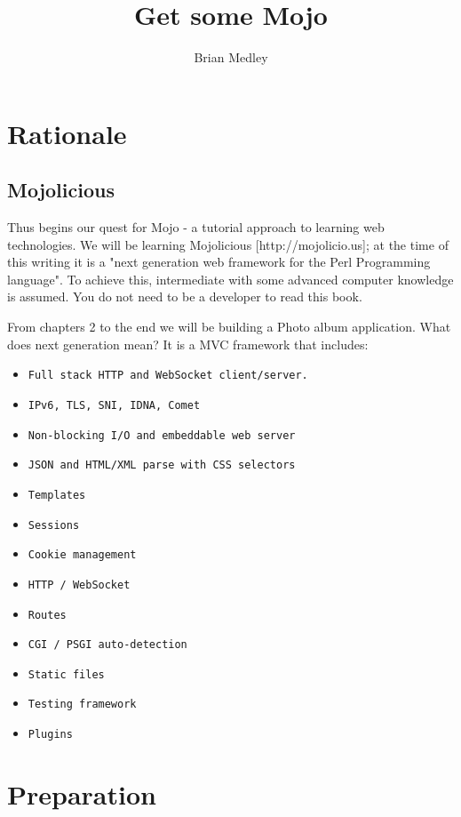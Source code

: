 \documentclass[14pt]{extreport}
\begin{document}
\title{Get some Mojo}
\author{Brian Medley}

\maketitle
\tableofcontents

\chapter*{Rationale}

\section{Mojolicious}

Thus begins our quest for Mojo - a tutorial approach to learning web
technologies. We will be learning Mojolicious [http://mojolicio.us]; at the
time of this writing it is a "next generation web framework for the Perl
Programming language". To achieve this, intermediate with some advanced
computer knowledge is assumed. You do not need to be a developer to read this
book.

From chapters 2 to the end we will be building a Photo album application. What
does next generation mean? It is a MVC framework that includes:

\begin{itemize} \itemsep1pt \parskip0pt 
\item \verb|Full stack HTTP and WebSocket client/server.|
\item \verb|IPv6, TLS, SNI, IDNA, Comet|
\item \verb|Non-blocking I/O and embeddable web server|
\item \verb|JSON and HTML/XML parse with CSS selectors|
\item \verb|Templates|
\item \verb|Sessions|
\item \verb|Cookie management|
\item \verb|HTTP / WebSocket|
\item \verb|Routes|
\item \verb|CGI / PSGI auto-detection|
\item \verb|Static files|
\item \verb|Testing framework|
\item \verb|Plugins|
\end{itemize}

\chapter*{Preparation}
\end{document}
